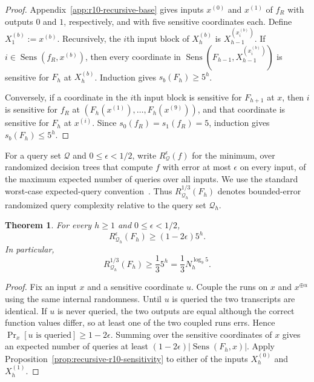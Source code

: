 \documentclass[11pt]{article}
\numberwithin{equation}{section}
\newtheorem{theorem}[definition]{Theorem}
\theoremstyle{remark}
\begin{document}
\begin{proof}
Appendix~\ref{app:r10-recursive-base} gives inputs $x^{(0)}$ and $x^{(1)}$
of $f_R$ with outputs $0$ and $1$, respectively, and with five sensitive
coordinates each. Define $X_1^{(b)}:=x^{(b)}$. Recursively, the $i$th input
block of $X_h^{(b)}$ is $X_{h-1}^{(x_i^{(b)})}$. If
$i\in\operatorname{Sens}(f_R,x^{(b)})$, then every coordinate in
$\operatorname{Sens}(F_{h-1},X_{h-1}^{(x_i^{(b)})})$ is sensitive for
$F_h$ at $X_h^{(b)}$. Induction gives $s_b(F_h)\geq5^h$.

Conversely, if a coordinate in the $i$th input block is sensitive for
$F_{h+1}$ at $x$, then $i$ is sensitive for $f_R$ at
$(F_h(x^{(1)}),\ldots,F_h(x^{(9)}))$, and that coordinate is sensitive for
$F_h$ at $x^{(i)}$. Since $s_0(f_R)=s_1(f_R)=5$, induction gives
$s_b(F_h)\leq5^h$.
\end{proof}

For a query set $\mathcal Q$ and $0\leq\epsilon<1/2$, write
$R^\epsilon_{\mathcal Q}(f)$ for the minimum, over randomized decision trees
that compute $f$ with error at most $\epsilon$ on every input, of the maximum
expected number of queries over all inputs. We use the standard worst-case
expected-query convention~\cite{BuhrmanDeWolf2002}. Thus
$R^{1/3}_{\mathcal Q_h}(F_h)$ denotes bounded-error randomized query
complexity relative to the query set $\mathcal Q_h$.

\begin{theorem}
\label{thm:recursive-r10-randomized-lower}
For every $h\geq1$ and $0\leq\epsilon<1/2$,
\begin{equation}
    R^\epsilon_{\mathcal Q_h}(F_h)
    \geq
    (1-2\epsilon)5^h.
\end{equation}
In particular,
\begin{equation}
    R^{1/3}_{\mathcal Q_h}(F_h)
    \geq
    \frac13 5^h
    =
    \frac13 N_h^{\log_9 5}.
\end{equation}
\end{theorem}

\begin{proof}
Fix an input $x$ and a sensitive coordinate $u$.  Couple the runs on $x$ and
$x^{\oplus u}$ using the same internal randomness.  Until $u$ is queried the
two transcripts are identical.  If $u$ is never queried, the two outputs are
equal although the correct function values differ, so at least one
of the two coupled runs errs.  Hence $\Pr_x[\text{$u$ is queried}]\geq1-2\epsilon$. Summing over the
sensitive coordinates of $x$ gives an expected number of
queries at least $(1-2\epsilon)|\operatorname{Sens}(F_h,x)|$.  Apply
Proposition~\ref{prop:recursive-r10-sensitivity} to either of the inputs
$X_h^{(0)}$ and $X_h^{(1)}$.
\end{proof}
\end{document}
